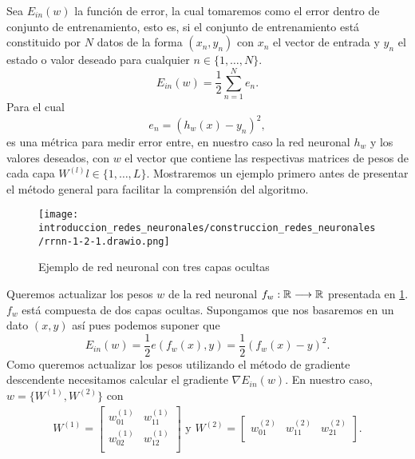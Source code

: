 Sea $E_{in}(w)$ la función de error, la cual tomaremos como el error dentro de conjunto de entrenamiento, esto es,  si el conjunto 
de entrenamiento está constituido por $N$ datos de la forma $(x_n, y_n)$ con $x_n$ el vector de entrada y $y_n$ el estado o valor deseado para cualquier $n\in \{1, \ldots, N\}.$
\begin{equation}
    E_{in}(w) = \frac{1}{2} \sum^N_{n=1} e_n. 
\end{equation}
Para el cual 
\begin{equation}
    e_n = (h_w(x)- y_n)^2, 
\end{equation}
es una métrica para medir error entre, en nuestro caso  
la red neuronal $h_w$ y los valores deseados, con $w$ el vector que contiene las respectivas matrices de pesos de cada capa 
$W^{(l)} l \in \{1, \ldots, L\}.$  
Mostraremos un ejemplo primero antes de presentar el método general para facilitar la comprensión del algoritmo. 
\begin{figure}[h!]
    \texttt{[image: introduccion\_redes\_neuronales/construccion\_redes\_neuronales/rrnn-1-2-1.drawio.png]}
    \caption{Ejemplo de red neuronal con tres capas ocultas}
    \label{img:construccion_rrnn:rrnn-1-2-1}
\end{figure} 
Queremos actualizar los pesos $w$ de la red neuronal 
$f_w : \mathbb{R} \longrightarrow \mathbb{R}$ presentada en \ref{img:construccion_rrnn:rrnn-1-2-1}.
$f_w$ está compuesta de dos capas ocultas. Supongamos que nos basaremos en un dato 
$(x, y)$ así pues podemos suponer que 
\begin{equation}
    E_{in}(w) = \frac{1}{2}e(f_w(x), y) = \frac{1}{2} (f_w(x)- y)^2.
\end{equation}
Como queremos actualizar los pesos utilizando el método de gradiente descendente necesitamos calcular el gradiente $\nabla E_{in}(w)$. 
En nuestro caso, $w=\{W^{(1)}, W^{(2)}\}$ con 
\begin{align}
    W^{(1)} = 
    \begin{bmatrix}
        w^{(1)}_{01} & w^{(1)}_{11} \\
        w^{(1)}_{02} & w^{(1)}_{12} \\
    \end{bmatrix} 
    \text{ y }
    W^{(2)} = 
    \begin{bmatrix}
        w^{(2)}_{01} & w^{(2)}_{11} & w^{(2)}_{21}\\
    \end{bmatrix}. 
\end{align}
